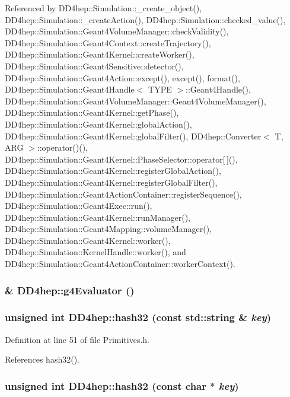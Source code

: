 Referenced by DD4hep::Simulation::\_\-create\_\-object(), DD4hep::Simulation::\_\-createAction(), DD4hep::Simulation::checked\_\-value(), DD4hep::Simulation::Geant4VolumeManager::checkValidity(), DD4hep::Simulation::Geant4Context::createTrajectory(), DD4hep::Simulation::Geant4Kernel::createWorker(), DD4hep::Simulation::Geant4Sensitive::detector(), DD4hep::Simulation::Geant4Action::except(), except(), format(), DD4hep::Simulation::Geant4Handle$<$ TYPE $>$::Geant4Handle(), DD4hep::Simulation::Geant4VolumeManager::Geant4VolumeManager(), DD4hep::Simulation::Geant4Kernel::getPhase(), DD4hep::Simulation::Geant4Kernel::globalAction(), DD4hep::Simulation::Geant4Kernel::globalFilter(), DD4hep::Converter$<$ T, ARG $>$::operator()(), DD4hep::Simulation::Geant4Kernel::PhaseSelector::operator\mbox{[}$\,$\mbox{]}(), DD4hep::Simulation::Geant4Kernel::registerGlobalAction(), DD4hep::Simulation::Geant4Kernel::registerGlobalFilter(), DD4hep::Simulation::Geant4ActionContainer::registerSequence(), DD4hep::Simulation::Geant4Exec::run(), DD4hep::Simulation::Geant4Kernel::runManager(), DD4hep::Simulation::Geant4Mapping::volumeManager(), DD4hep::Simulation::Geant4Kernel::worker(), DD4hep::Simulation::KernelHandle::worker(), and DD4hep::Simulation::Geant4ActionContainer::workerContext().\hypertarget{namespace_d_d4hep_a2c55ed8f8639b7c032f6ea646bf7898d}{
\subsubsection[{g4Evaluator}]{\& DD4hep::g4Evaluator ()}}
\label{namespace_d_d4hep_a2c55ed8f8639b7c032f6ea646bf7898d}
\hypertarget{namespace_d_d4hep_a856fab7f400a9e8c0e3f999f933d3883}{
\subsubsection[{hash32}]{\setlength{\rightskip}{0pt plus 5cm}unsigned int DD4hep::hash32 (const std::string \& {\em key})}}
\label{namespace_d_d4hep_a856fab7f400a9e8c0e3f999f933d3883}


Definition at line 51 of file Primitives.h.

References hash32().\hypertarget{namespace_d_d4hep_a64c38e1f6b17efb9177457a3f2690daa}{
\subsubsection[{hash32}]{\setlength{\rightskip}{0pt plus 5cm}unsigned int DD4hep::hash32 (const char $\ast$ {\em key})}}
\label{namespace_d_d4hep_a64c38e1f6b17efb9177457a3f2690daa}



